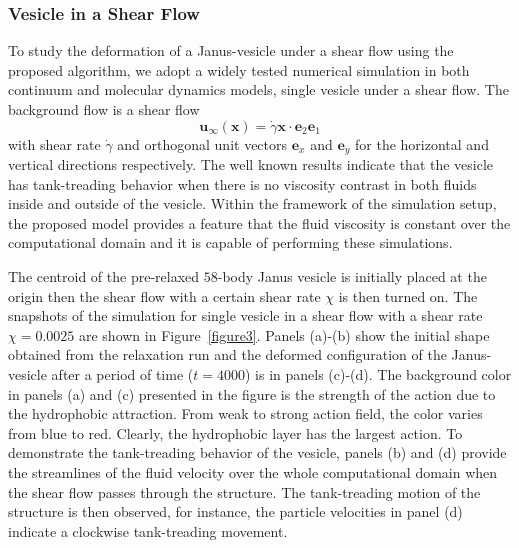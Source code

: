 \documentclass[lineno]{jfm}
\newcommand{\xx}{\mathbf{x}}
\newcommand{\uu}{\mathbf{u}}
\begin{document}
\subsubsection{Vesicle in a Shear Flow}
\label{sec:ves_in_shear}
To study the deformation of a Janus-vesicle under a shear flow using the proposed algorithm, 
we adopt a widely tested numerical simulation in both continuum and molecular dynamics models, single vesicle under a shear flow. 
The background flow is a shear flow 
\begin{equation}
\uu_{\infty}(\xx) = \dot\gamma  \xx \cdot \mathbf{e}_2 \mathbf{e}_1
\end{equation}
with shear rate $\dot\gamma$
and orthogonal unit vectors $\mathbf{e}_x$ and $\mathbf{e}_y$ for the horizontal and vertical directions respectively. 
The well known results indicate that the vesicle has tank-treading behavior when 
there is no viscosity contrast in both fluids inside and outside of the vesicle. Within the framework of the simulation setup, the proposed model provides a feature that the fluid viscosity is constant over the computational domain and it is capable of performing these simulations.

The centroid of the pre-relaxed $58$-body Janus vesicle is initially placed at the origin then the shear flow 
with a certain shear rate $\chi$ is then turned on. 
The snapshots of the simulation for single vesicle in a shear flow with a shear rate $\chi=0.0025$ are shown 
in Figure~\ref{figure3}.
Panels (a)-(b) show the initial shape obtained from the relaxation run and the deformed 
configuration of the Janus-vesicle after a period of time ($t=4000$) is in panels (c)-(d). 
The background color in panels (a) and (c) presented in the figure is the strength of the action due to the
hydrophobic attraction. From weak to strong action field, the color varies from blue to red. Clearly, the
hydrophobic layer has the largest action. To demonstrate the tank-treading behavior of the vesicle, panels (b) 
and (d) provide the streamlines of the fluid velocity over the whole computational domain when the shear 
flow passes through the structure. The tank-treading motion of the structure is then observed, for instance,
the particle velocities in panel (d) indicate a clockwise tank-treading movement.
\end{document}
